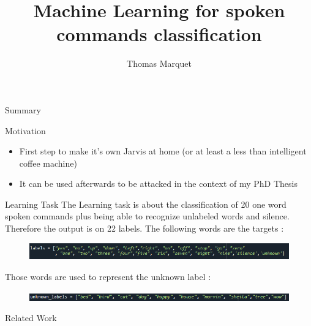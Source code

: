 \documentclass{beamer}
\title{Machine Learning for spoken commands classification}
\author{Thomas Marquet}
\begin{document}
	
	\begin{frame}
		\titlepage
	\end{frame}
	
	\begin{frame}{Summary}
		\tableofcontents[]
	\end{frame}	
	
	\begin{frame}{Motivation} 
		\begin{itemize}
		    \item First step to make it's own Jarvis at home (or at least a less than intelligent coffee machine)
		    \item It can be used afterwards to be attacked in the context of my PhD Thesis
		\end{itemize}
		
	\end{frame}

	\begin{frame}{Learning Task} 
        The Learning task is about the classification of 20 one word spoken commands plus being able to recognize unlabeled words and silence. Therefore the output is on 22 labels.
        \vspace{5mm}
        The following words are the targets :
        \begin{figure}
            \centering
            \includegraphics[width=1\textwidth]{pics/labels.PNG}

        \end{figure}
        
        
        \vspace{5mm}
        Those words are used to represent the unknown label :
        \begin{figure}
            \centering
            \includegraphics[width=1\textwidth]{pics/unknown_labels.PNG}

        \end{figure}        
        
	\end{frame}

	\begin{frame}{Related Work} 

	\end{frame}
	
\end{document}
